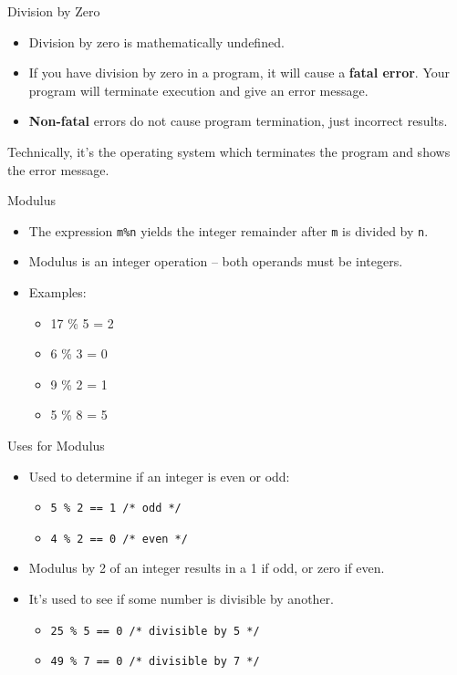 \documentclass[graphics]{beamer}
\begin{document}
\begin{frame}{Division by Zero}
    \begin{itemize}
        \item Division by zero is mathematically undefined.
        \item If you have division by zero in a program, it will cause a \textbf{fatal error}. Your program will terminate execution and give an error message.
        \item \textbf{Non-fatal} errors do not cause program termination, just incorrect results.
    \end{itemize}
    
    \vfill
    \footnotesize{Technically, it's the operating system which terminates the program and shows the error message.}
\end{frame}

\begin{frame}{Modulus}
    \begin{itemize}
        \item The expression \texttt{m\%n} yields the integer remainder after \texttt{m} is divided by \texttt{n}.
        \item Modulus is an integer operation -- both operands must be integers.
        \item Examples:
        \begin{itemize}
            \item 17 \% 5 = 2
            \item 6 \% 3 = 0
            \item 9 \% 2 = 1
            \item 5 \% 8 = 5
        \end{itemize}
    \end{itemize}
\end{frame}

\begin{frame}{Uses for Modulus}
    \begin{itemize}
        \item Used to determine if an integer is even or odd:
        \begin{itemize}
            \item \texttt{5 \% 2 == 1 /* odd */}
            \item \texttt{4 \% 2 == 0 /* even */}
        \end{itemize}
        \item Modulus by 2 of an integer results in a 1 if odd, or zero if even.
        \item It's used to see if some number is divisible by another.
        \begin{itemize}
            \item \texttt{25 \% 5 == 0 /* divisible by 5 */}
            \item \texttt{49 \% 7 == 0 /* divisible by 7 */}
        \end{itemize}
    \end{itemize}
\end{frame}
\end{document}
